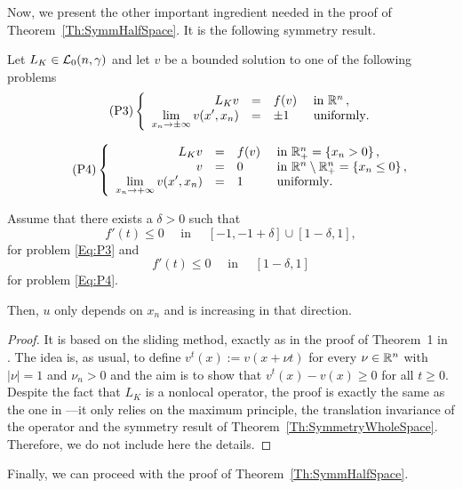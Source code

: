 Now, we present the other important ingredient needed in the proof of Theorem~\ref{Th:SymmHalfSpace}. It is the following symmetry result.

\begin{proposition}
\label{Prop:HalfSpaceLimUnif}
Let $L_K \in \mathcal{L}_0(n,\gamma)$ and let $v$ be a bounded solution to one of the following problems
\begin{equation}
\leqnomode
\tag{P3}
\label{Eq:P3}
\beqc{\PDEsystem}
L_K  v &=& f(v)  &\textrm{ in }\R^n\,,\\
\ds \lim_{x_n \to \pm \infty} v(x',x_n) &=& \pm 1 \,\,\, &\textrm{ uniformly}.
\eeqc
\end{equation}

\begin{equation}
\leqnomode
\tag{P4}
\label{Eq:P4}
\beqc{\PDEsystem}
L_K  v &=& f(v)  &\textrm{ in }\R^n_+ = \{ x_n>0\} \,,\\
v &=& 0  &\textrm{ in } \R^n \setminus \R^n_+ = \{ x_n\leq 0\}\,,\\
\ds \lim_{x_n \to + \infty} v(x',x_n) &=& 1 \,\,\, &\textrm{ uniformly}.
\eeqc
\end{equation}

\reqnomode

Assume that there exists a $\delta > 0$ such that
$$ f'(t) \leq 0 \quad \text{ in } \quad [-1,-1+\delta]\cup[1-\delta,1], $$
for problem \eqref{Eq:P3} and
$$ f'(t) \leq 0 \quad \text{ in } \quad [1-\delta,1] $$
for problem \eqref{Eq:P4}.

Then, $u$ only depends on $x_n$ and is increasing in that direction.
\end{proposition}

\begin{proof}
It is based on the sliding method, exactly as in the proof of Theorem~1 in \cite{BerestyckiHamelMonneau}. The idea is, as usual,   to define $ v^t(x) := v(x+\nu t) $ for every $\nu\in\mathbb{R}^n$ with $|\nu|=1$ and $\nu_n>0$ and the aim is to show that $v^t(x)-v(x)\geq 0$ for all $t\geq 0$. Despite the fact that $L_K$ is a nonlocal operator, the proof is exactly the same as the one in \cite{BerestyckiHamelMonneau} ---it only relies on the maximum principle, the translation invariance of the operator and the symmetry result of Theorem~\ref{Th:SymmetryWholeSpace}. Therefore, we do not include here the details.
\end{proof}






Finally, we can proceed with the proof of Theorem~\ref{Th:SymmHalfSpace}.

